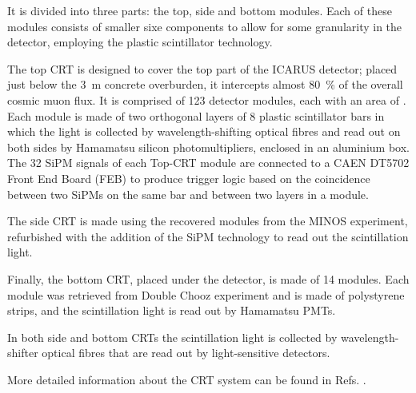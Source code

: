 It is divided into three parts: the top, side and bottom modules. Each of these modules consists of smaller sixe components to allow for some granularity in the detector, employing the plastic scintillator technology. 

The top CRT is designed to cover the top part of the ICARUS detector; placed just below the \SI{3}{\m} concrete overburden, it intercepts almost \SI{80}{\percent} of the overall cosmic muon flux. It is comprised of 123 detector modules, each with an area of . Each module is made of two orthogonal layers of 8 plastic scintillator bars in which the light is collected by wavelength-shifting optical fibres and read out on both sides by Hamamatsu silicon photomultipliers, enclosed in an aluminium box. The 32 SiPM signals of each Top-CRT module are connected to a CAEN DT5702 Front End  Board (FEB) to produce trigger logic based on  the coincidence between two SiPMs on the same bar and between two layers in a module. 

The side CRT is made using the recovered modules from the MINOS experiment, refurbished with the addition of the SiPM technology to read out the scintillation light.

Finally, the bottom CRT, placed under the detector, is made of 14 modules. Each module was retrieved from Double Chooz experiment and is made of polystyrene strips, and the scintillation light is read out by Hamamatsu PMTs. 

In both side and bottom CRTs the scintillation light is collected by wavelength-shifter optical fibres that are read out by light-sensitive detectors. 

More detailed information about the CRT system can be found in Refs. \cite{ICARUS:2025rdw,Poppi:2023zmp,Poppi:2022vhg}. 